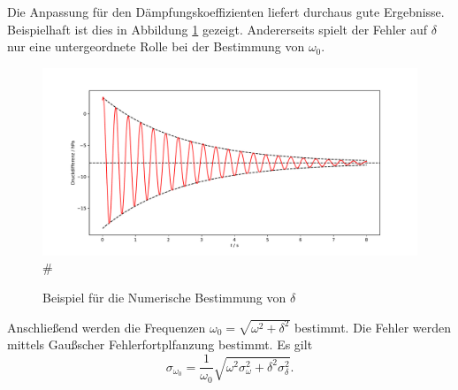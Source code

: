\documentclass[a4paper, 12pt]{scrartcl}
\begin{document}
Die Anpassung für den Dämpfungskoeffizienten liefert durchaus gute Ergebnisse. Beispielhaft ist dies in Abbildung \ref{abb:delta_anpassung} gezeigt. Andererseits spielt der Fehler auf $\delta$ nur eine untergeordnete Rolle bei der Bestimmung von $\omega_0$.

\begin{figure}[H]
\centering
\includegraphics[width=\textwidth]{plots/anpassung_delta.pdf}#
\caption{Beispiel für die Numerische Bestimmung von $\delta$}
\label{abb:delta_anpassung}
\end{figure}
 
Anschließend werden die Frequenzen $\omega_0 = \sqrt{\omega^2 + \delta^2}$ bestimmt. Die Fehler werden mittels Gaußscher Fehlerfortplfanzung bestimmt. Es gilt
$$\sigma_{\omega_0} = \frac 1{\omega_0} \sqrt{\omega^2\sigma_{\omega}^2 + \delta^2\sigma_{\delta}^2}.$$
\end{document}
